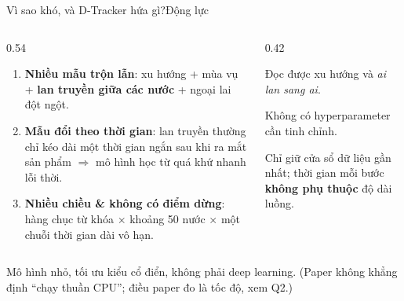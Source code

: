\begin{frame}{Vì sao khó, và D-Tracker hứa gì?}{Động lực}
\begin{columns}[T,onlytextwidth]
\begin{column}{0.54\textwidth}
  \par\vspace{1mm}
  \begin{enumerate}
    \item \textbf{Nhiều mẫu trộn lẫn}: xu hướng + mùa vụ + \textbf{lan truyền giữa các nước} + ngoại lai đột ngột.
    \item \textbf{Mẫu đổi theo thời gian}: lan truyền thường chỉ kéo dài một thời gian ngắn sau khi ra mắt sản phẩm
      $\Rightarrow$ mô hình học từ quá khứ nhanh lỗi thời.
    \item \textbf{Nhiều chiều \& không có điểm dừng}: hàng chục từ khóa $\times$ khoảng 50 nước $\times$ một chuỗi thời gian dài vô hạn.
  \end{enumerate}
\end{column}
\begin{column}{0.42\textwidth}
  \par\vspace{1mm}
  \begin{mathcard}[Interpretable]
    \small Đọc được xu hướng và \emph{ai lan sang ai}.
  \end{mathcard}\par\vspace{1.5mm}
  \begin{mathcard}[Automatic]
    \small Không có hyperparameter cần tinh chỉnh.
  \end{mathcard}\par\vspace{1.5mm}
  \begin{mathcard}[Scalable]
    \small Chỉ giữ cửa sổ dữ liệu gần nhất; thời gian mỗi bước
    \textbf{không phụ thuộc} độ dài luồng.
  \end{mathcard}
\end{column}
\end{columns}
\vspace{2mm}
{\small\color{DTMuted}Mô hình nhỏ, tối ưu kiểu cổ điển, không phải deep learning. (Paper không khẳng định ``chạy thuần CPU''; điều paper đo là tốc độ, xem Q2.)\par}
\end{frame}


